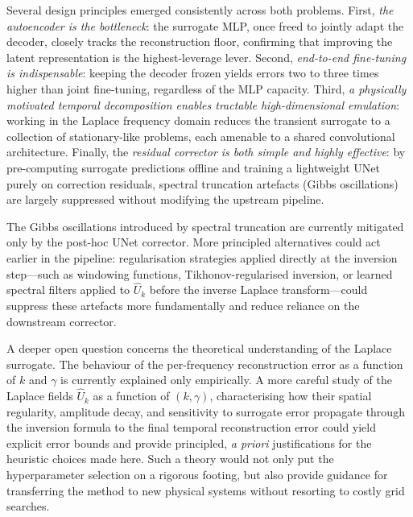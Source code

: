 \documentclass[a4paper]{article}
\begin{document}
Several design principles emerged consistently across both problems. First, \emph{the autoencoder is the bottleneck}: the surrogate MLP, once freed to jointly adapt the decoder, closely tracks the reconstruction floor, confirming that improving the latent representation is the highest-leverage lever. Second, \emph{end-to-end fine-tuning is indispensable}: keeping the decoder frozen yields errors two to three times higher than joint fine-tuning, regardless of the MLP capacity. Third, \emph{a physically motivated temporal decomposition enables tractable high-dimensional emulation}: working in the Laplace frequency domain reduces the transient surrogate to a collection of stationary-like problems, each amenable to a shared convolutional architecture. Finally, the \emph{residual corrector is both simple and highly effective}: by pre-computing surrogate predictions offline and training a lightweight UNet purely on correction residuals, spectral truncation artefacts (Gibbs oscillations) are largely suppressed without modifying the upstream pipeline.

The Gibbs oscillations introduced by spectral truncation are currently mitigated only by the post-hoc UNet corrector. More principled alternatives could act earlier in the pipeline: regularisation strategies applied directly at the inversion step—such as windowing functions, Tikhonov-regularised inversion, or learned spectral filters applied to $\hat{U}_k$ before the inverse Laplace transform—could suppress these artefacts more fundamentally and reduce reliance on the downstream corrector.

A deeper open question concerns the theoretical understanding of the Laplace surrogate. The behaviour of the per-frequency reconstruction error as a function of $k$ and $\gamma$ is currently explained only empirically. A more careful study of the Laplace fields $\hat{U}_k$ as a function of $(k, \gamma)$, characterising how their spatial regularity, amplitude decay, and sensitivity to surrogate error propagate through the inversion formula to the final temporal reconstruction error could yield explicit error bounds and provide principled, \textit{a priori} justifications for the heuristic choices made here. Such a theory would not only put the hyperparameter selection on a rigorous footing, but also provide guidance for transferring the method to new physical systems without resorting to costly grid searches.

\newpage


\end{document}
